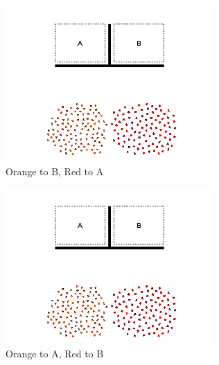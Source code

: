\documentclass[]{article}
\begin{document}
\begin{figure}
\begin{subfigure}{0.42\textwidth}
		\includegraphics[width=\linewidth]{slide_images/Swarm_Robot_Control_-_100_Robot_0011.png}
		\caption{Orange to B, Red to A}
		\label{fig:sub1}
	\end{subfigure}%
	\begin{subfigure}{0.42\textwidth}
		\centering
		\includegraphics[width=\linewidth]{slide_images/Swarm_Robot_Control_-_100_Robot_0013.png}
		\caption{Orange to A, Red to B}
		\label{fig:sub2}
	\end{subfigure}
	\begin{subfigure}{0.42\textwidth}
		\centering

\end{subfigure}
\end{figure}
\end{document}
